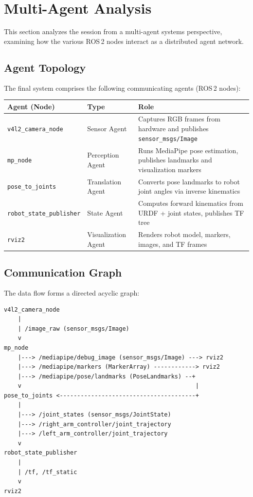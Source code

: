 \documentclass[11pt,a4paper]{article}
\begin{document}
\section{Multi-Agent Analysis}

This section analyzes the session from a multi-agent systems perspective, examining how the various ROS\,2 nodes interact as a distributed agent network.

\subsection{Agent Topology}

The final system comprises the following communicating agents (ROS\,2 nodes):

\begin{center}
\begin{tabular}{llp{6cm}}
\toprule
\textbf{Agent (Node)} & \textbf{Type} & \textbf{Role} \\
\midrule
\texttt{v4l2\_camera\_node} & Sensor Agent & Captures RGB frames from hardware and publishes \texttt{sensor\_msgs/Image} \\
\texttt{mp\_node} & Perception Agent & Runs MediaPipe pose estimation, publishes landmarks and visualization markers \\
\texttt{pose\_to\_joints} & Translation Agent & Converts pose landmarks to robot joint angles via inverse kinematics \\
\texttt{robot\_state\_publisher} & State Agent & Computes forward kinematics from URDF + joint states, publishes TF tree \\
\texttt{rviz2} & Visualization Agent & Renders robot model, markers, images, and TF frames \\
\bottomrule
\end{tabular}
\end{center}

\subsection{Communication Graph}

The data flow forms a directed acyclic graph:

\begin{verbatim}
v4l2_camera_node
    |
    | /image_raw (sensor_msgs/Image)
    v
mp_node
    |---> /mediapipe/debug_image (sensor_msgs/Image) ---> rviz2
    |---> /mediapipe/markers (MarkerArray) ------------> rviz2
    |---> /mediapipe/pose/landmarks (PoseLandmarks) --+
    v                                                  |
pose_to_joints <---------------------------------------+
    |
    |---> /joint_states (sensor_msgs/JointState)
    |---> /right_arm_controller/joint_trajectory
    |---> /left_arm_controller/joint_trajectory
    v
robot_state_publisher
    |
    | /tf, /tf_static
    v
rviz2
\end{verbatim}
\end{document}
